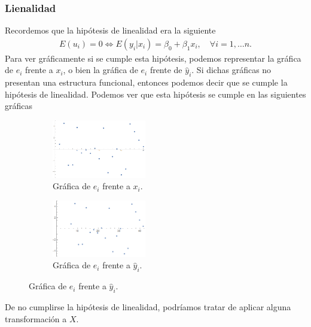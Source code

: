 \subsubsection{Lienalidad}
Recordemos que la hipótesis de linealidad era la siguiente
\begin{align*}
    E(u_i) = 0 \Longleftrightarrow E(y_i | x_i) = \beta_0 + \beta_1 x_i, \quad \forall i = 1, \dots n.
\end{align*}
Para ver gráficamente si se cumple esta hipótesis, podemos representar la gráfica de $e_i$ frente a $x_i$, o bien la gráfica de $e_i$ frente de $\widehat{y}_i$. Si dichas gráficas no presentan una estructura funcional, entonces podemos decir que se cumple la hipótesis de linealidad. Podemos ver que esta hipótesis se cumple en las siguientes gráficas
\begin{figure}[H]
    \begin{subfigure}[b]{0.45\textwidth}
        \centering
        \includegraphics[width=0.45\textwidth]{imagenes1/linealidadx.png}
        \caption{Gráfica de $e_i$ frente a $x_i$.}
    \end{subfigure}
    \begin{subfigure}[b]{0.45\textwidth}
        \centering
        \includegraphics[width=0.45\textwidth]{imagenes1/linealidady.png}
        \caption{Gráfica de $e_i$ frente a $\widehat{y}_i$.}
    \end{subfigure}
\end{figure}
De no cumplirse la hipótesis de linealidad, podríamos tratar de aplicar alguna transformación a $X$.
